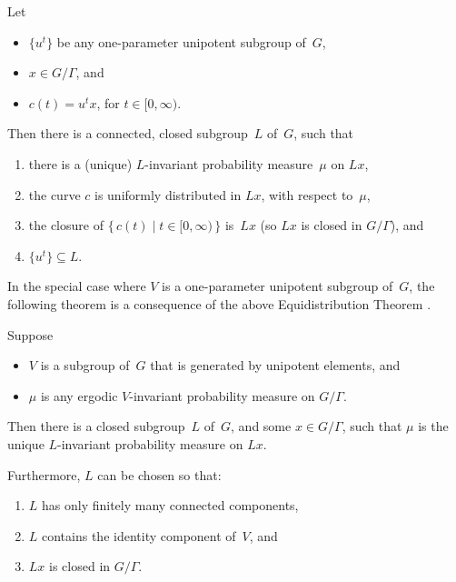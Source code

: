 \begin{namedthm} \label{Ratner-Equidistribution}
Let 
	\begin{itemize}
	\item $\{u^t\}$ be any one-parameter unipotent subgroup of~$G$,
	\item $x \in G/\Gamma$,
	and
	\item $c(t) = u^t x$, for $t \in [0,\infty)$.
	\end{itemize}
Then there is a connected, closed subgroup~$L$ of~$G$, such that
	\begin{enumerate}
	\item there is a\/ \textup(unique\textup) $L$-invariant probability measure~$\mu$ on $L x$,
	\item the curve $c$ is uniformly distributed in $L x$, with respect to~$\mu$,
	\item the closure of\/ $\{\, c(t) \mid t \in [0,\infty) \,\}$ is~$L x$ \textup(so $L x$ is closed in $G/\Gamma$\textup),
	and
	\item $\{u^t\} \subseteq L$.
	\end{enumerate}
\end{namedthm}

In the special case where $V$ is a one-parameter unipotent subgroup of~$G$, the following theorem is a consequence of the above Equidistribution Theorem .

\begin{namedthm} \label{Ratner-MeasClass}
Suppose
\noprelistbreak
	\begin{itemize}
	\item $V$ is a subgroup of~$G$ that is generated by unipotent elements, 
	and
	\item $\mu$ is any ergodic $V$-invariant probability measure on\/ $G/\Gamma$.
	\end{itemize}
Then there is a closed subgroup~$L$ of~$G$, and some $x \in G/\Gamma$, such that $\mu$ is the unique $L$-invariant probability measure on $L x$. 

Furthermore, $L$ can be chosen so that:
	\begin{enumerate}
	\item $L$ has only finitely many connected components,
	\item $L$ contains the identity component of~$V$,
	and
	\item $L x$ is closed in $G/\Gamma$.
	\end{enumerate}
\end{namedthm}

